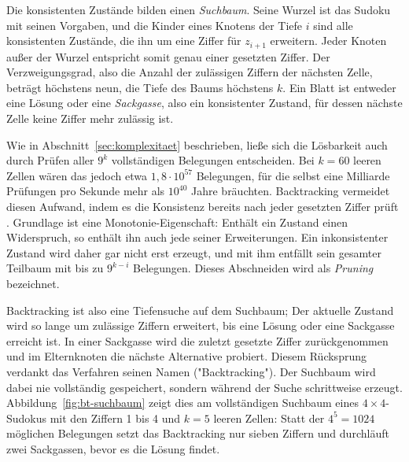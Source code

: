 Die konsistenten Zustände bilden einen \emph{Suchbaum}. 
Seine Wurzel ist das Sudoku mit seinen Vorgaben, 
und die Kinder eines Knotens der Tiefe $i$ sind alle konsistenten Zustände, die ihn um eine Ziffer für $z_{i+1}$ erweitern. 
Jeder Knoten außer der Wurzel entspricht somit genau einer gesetzten Ziffer. 
Der Verzweigungsgrad, also die Anzahl der zulässigen Ziffern der nächsten Zelle, beträgt höchstens neun, 
die Tiefe des Baums höchstens $k$. 
Ein Blatt ist entweder eine Lösung oder eine \emph{Sackgasse}, 
also ein konsistenter Zustand, für dessen nächste Zelle keine Ziffer mehr zulässig ist.

Wie in Abschnitt~\ref{sec:komplexitaet} beschrieben, 
ließe sich die Lösbarkeit auch durch Prüfen aller $9^k$ vollständigen Belegungen entscheiden. 
Bei $k = 60$ leeren Zellen wären das jedoch etwa $1{,}8 \cdot 10^{57}$ Belegungen, 
für die selbst eine Milliarde Prüfungen pro Sekunde mehr als $10^{40}$ Jahre bräuchten. 
Backtracking vermeidet diesen Aufwand, indem es die Konsistenz bereits nach jeder gesetzten Ziffer prüft . 
Grundlage ist eine Monotonie-Eigenschaft: Enthält ein Zustand einen Widerspruch, so enthält ihn auch jede seiner Erweiterungen. 
Ein inkonsistenter Zustand wird daher gar nicht erst erzeugt, 
und mit ihm entfällt sein gesamter Teilbaum mit bis zu $9^{k-i}$ Belegungen. 
Dieses Abschneiden wird als \emph{Pruning} bezeichnet.

Backtracking ist also eine Tiefensuche auf dem Suchbaum; 
Der aktuelle Zustand wird so lange um zulässige Ziffern erweitert, bis eine Lösung oder eine Sackgasse erreicht ist. 
In einer Sackgasse wird die zuletzt gesetzte Ziffer zurückgenommen und im Elternknoten die nächste Alternative probiert. 
Diesem Rücksprung verdankt das Verfahren seinen Namen ("Backtracking"). 
Der Suchbaum wird dabei nie vollständig gespeichert, sondern während der Suche schrittweise erzeugt. 
Abbildung~\ref{fig:bt-suchbaum} zeigt dies am vollständigen Suchbaum eines $4 \times 4$-Sudokus 
mit den Ziffern 1 bis 4 und $k = 5$ leeren Zellen: 
Statt der $4^5 = 1024$ möglichen Belegungen setzt das Backtracking nur sieben Ziffern 
und durchläuft zwei Sackgassen, bevor es die Lösung findet.

